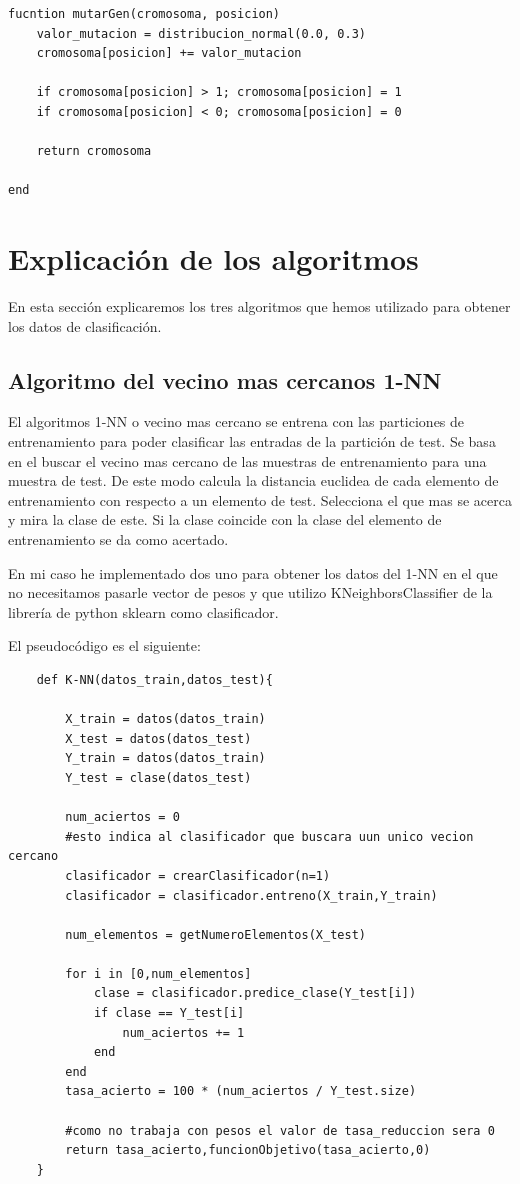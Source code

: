 \documentclass[titlepage]{article}
\begin{document}
	\begin{lstlisting}
fucntion mutarGen(cromosoma, posicion)
	valor_mutacion = distribucion_normal(0.0, 0.3)
	cromosoma[posicion] += valor_mutacion
	
	if cromosoma[posicion] > 1; cromosoma[posicion] = 1	
	if cromosoma[posicion] < 0; cromosoma[posicion] = 0
	
	return cromosoma

end
	\end{lstlisting}	
	\newpage
	
	\section{Explicación de los algoritmos}
	En esta sección explicaremos los tres algoritmos que hemos utilizado para obtener los datos de clasificación.
	
	\subsection{Algoritmo del vecino mas cercanos 1-NN}
	El algoritmos 1-NN o vecino mas cercano se entrena con las particiones de entrenamiento para poder clasificar las entradas de la partición de test. Se basa en el buscar el vecino mas cercano de las muestras de entrenamiento para una muestra de test. De este modo calcula la distancia euclidea de cada elemento de entrenamiento con respecto a un elemento de test. Selecciona el que mas se acerca y mira la clase de este. Si la clase coincide con la clase del elemento de entrenamiento se da como acertado.
	
	En mi caso he implementado dos uno para obtener los datos del 1-NN en el que no necesitamos pasarle vector de pesos y que utilizo KNeighborsClassifier de la librería de python sklearn como clasificador.
	
	El pseudocódigo es el siguiente:
	\begin{lstlisting}
	def K-NN(datos_train,datos_test){
	
		X_train = datos(datos_train)
		X_test = datos(datos_test)
		Y_train = datos(datos_train)
		Y_test = clase(datos_test)
		
		num_aciertos = 0
		#esto indica al clasificador que buscara uun unico vecion cercano
		clasificador = crearClasificador(n=1)
		clasificador = clasificador.entreno(X_train,Y_train)
		
		num_elementos = getNumeroElementos(X_test)
		
		for i in [0,num_elementos]
			clase = clasificador.predice_clase(Y_test[i])
			if clase == Y_test[i]
				num_aciertos += 1
			end
		end
		tasa_acierto = 100 * (num_aciertos / Y_test.size)
		
		#como no trabaja con pesos el valor de tasa_reduccion sera 0
		return tasa_acierto,funcionObjetivo(tasa_acierto,0)
	}
	\end{lstlisting}
	\newpage
	
\end{document}
